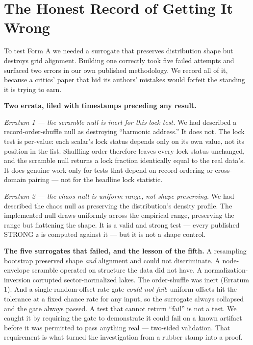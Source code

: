 \documentclass[11pt, letterpaper, openany]{book}
\begin{document}
\section{The Honest Record of Getting It Wrong}
 
To test Form A we needed a surrogate that preserves distribution shape but destroys grid
alignment. Building one correctly took five failed attempts and surfaced two errors in
our own published methodology. We record all of it, because a critics' paper that hid its
authors' mistakes would forfeit the standing it is trying to earn.
 
\begin{warningbox}
\textbf{Two errata, filed with timestamps preceding any result.}
 
\emph{Erratum 1 --- the scramble null is inert for this lock test.} We had described a
record-order-shuffle null as destroying ``harmonic address.'' It does not. The lock test
is per-value: each scalar's lock status depends only on its own value, not its position in
the list. Shuffling order therefore leaves every lock status unchanged, and the scramble
null returns a lock fraction identically equal to the real data's. It does genuine work
only for tests that depend on record ordering or cross-domain pairing --- not for the
headline lock statistic.
 
\emph{Erratum 2 --- the chaos null is uniform-range, not shape-preserving.} We had
described the chaos null as preserving the distribution's density profile. The
implemented null draws uniformly across the empirical range, preserving the range but
flattening the shape. It is a valid and strong test --- every published STRONG z is
computed against it --- but it is not a shape control.
\end{warningbox}
 
\begin{warningbox}
\textbf{The five surrogates that failed, and the lesson of the fifth.} A resampling
bootstrap preserved shape \emph{and} alignment and could not discriminate. A node-envelope
scramble operated on structure the data did not have. A normalization-inversion corrupted
sector-normalized lakes. The order-shuffle was inert (Erratum 1). And a single-random-offset
rate gate \emph{could not fail}: uniform offsets hit the tolerance at a fixed chance rate
for any input, so the surrogate always collapsed and the gate always passed. A test that
cannot return ``fail'' is not a test. We caught it by requiring the gate to demonstrate it
could fail on a known artifact before it was permitted to pass anything real --- two-sided
validation. That requirement is what turned the investigation from a rubber stamp into a
proof.
\end{warningbox}
 
\end{document}
